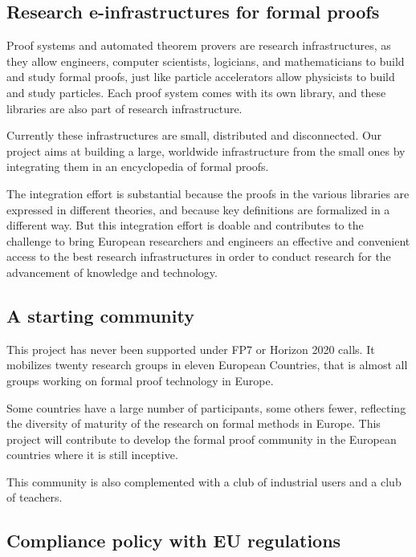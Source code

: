 \subsection{Research e-infrastructures for formal proofs}

Proof systems and automated theorem provers are research
infrastructures, as they allow engineers, computer scientists,
logicians, and mathematicians to build and study formal proofs, just
like particle accelerators allow physicists to build and study
particles. Each proof system comes with its own library, and these
libraries are also part of research infrastructure.

Currently these infrastructures are small, distributed and
disconnected.  Our project aims at building a large, worldwide
infrastructure from the small ones by integrating them in an
encyclopedia of formal proofs.

The integration effort is substantial because the proofs in the
various libraries are expressed in different theories, and because key
definitions are formalized in a different way.  But this integration
effort is doable and contributes to the challenge to bring European
researchers and engineers an effective and convenient access to the
best research infrastructures in order to conduct research for the
advancement of knowledge and technology.

\subsection{A starting community}

This project has never been supported under FP7 or Horizon 2020 calls.
It mobilizes twenty research groups in eleven European Countries, that is
almost all groups working on formal proof technology in Europe.

Some countries have a large number of participants, some others fewer,
reflecting the diversity of maturity of the research on formal methods
in Europe. This project will contribute to develop the formal proof
community in the European countries where it is still inceptive.

This community is also complemented with a club of industrial users and
a club of teachers. 

\subsection{Compliance policy with EU regulations}

